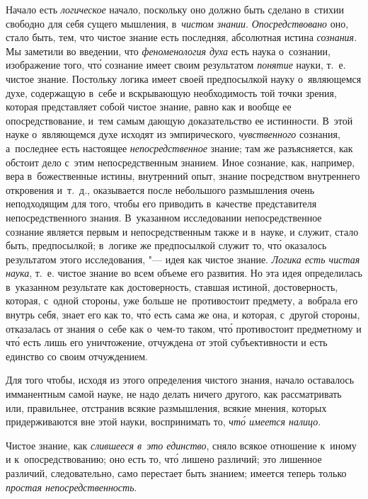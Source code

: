 Начало есть {\em логическое} начало, поскольку оно должно быть сделано в~стихии
свободно для себя сущего мышления, в~{\em чистом знании}. {\em Опосредствовано}
оно, стало быть, тем, что чистое знание есть последняя, абсолютная истина {\em
сознания}. Мы заметили во введении, что {\em феноменология духа} есть наука
о~сознании, изображение того, чт\'{о} сознание имеет своим результатом
{\em понятие} науки, т.~е. чистое знание. Постольку логика имеет своей
предпосылкой науку о~являющемся духе, содержащую в~себе и вскрывающую
необходимость той точки зрения, которая представляет собой чистое знание, равно
как и вообще ее опосредствование, и~тем самым дающую доказательство ее
истинности. В~этой науке о~являющемся духе исходят из эмпирического,
{\em чувственного} сознания, а~последнее есть настоящее {\em непосредственное}
знание; там же разъясняется, как обстоит дело с~этим непосредственным знанием.
Иное сознание, как, например, вера в~божественные истины, внутренний опыт,
знание посредством внутреннего откровения и~т.~д., оказывается после небольшого
размышления очень неподходящим для того, чтобы его приводить в~качестве
представителя непосредственного знания. В~указанном исследовании
непосредственное сознание является первым и непосредственным также и в~науке, и
служит, стало быть, предпосылкой; в~логике же предпосылкой служит то, чт\'{о}
оказалось результатом этого исследования, "--- идея как чистое знание.
{\em Логика есть чистая наука}, т.~е. чистое знание во всем объеме его
развития. Но эта идея определилась в~указанном результате как достоверность,
ставшая истиной, достоверность, которая, с~одной стороны, уже больше
не~противостоит предмету, а~вобрала его внутрь себя, знает его как то, чт\'{о}
есть сама же она, и которая, с~другой стороны, отказалась от знания о~себе как
о~чем-то таком, чт\'{о} противостоит предметному и чт\'{о} есть лишь его
уничтожение, отчуждена от этой субъективности и есть единство
со своим отчуждением.

Для того чтобы, исходя из этого определения чистого знания, начало оставалось
имманентным самой науке, не надо делать ничего другого, как рассматривать или,
правильнее, отстранив всякие размышления, всякие мнения, которых придерживаются
вне этой науки, воспринимать то, {\em чт\'{о} имеется налицо}.

Чистое знание, как {\em слившееся в~это единство}, сняло всякое отношение
к~иному и к~опосредствованию; оно есть то, чт\'{о} лишено различий; это
лишенное различий, следовательно, само перестает быть знанием; имеется теперь
только {\em простая непосредственность}.

